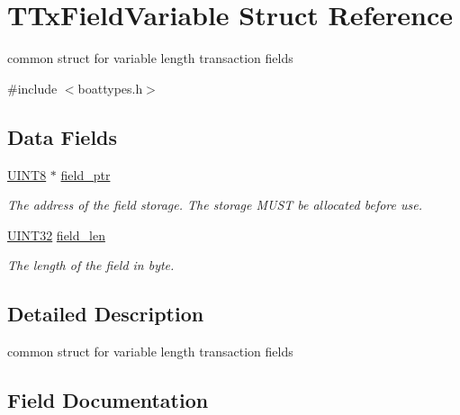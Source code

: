 \hypertarget{struct_t_tx_field_variable}{}\section{T\+Tx\+Field\+Variable Struct Reference}
\label{struct_t_tx_field_variable}


common struct for variable length transaction fields  




{\ttfamily \#include $<$boattypes.\+h$>$}

\subsection*{Data Fields}
\begin{DoxyCompactItemize}
\item 
\mbox{\hyperlink{boattypes_8h_ab27e9918b538ce9d8ca692479b375b6a}{U\+I\+N\+T8}} $\ast$ \mbox{\hyperlink{struct_t_tx_field_variable_aa9767f761e81f0c09d5cd7690d63578b}{field\+\_\+ptr}}
\begin{DoxyCompactList}\small\item\em The address of the field storage. The storage M\+U\+ST be allocated before use. \end{DoxyCompactList}\item 
\mbox{\hyperlink{boattypes_8h_ae1e6edbbc26d6fbc71a90190d0266018}{U\+I\+N\+T32}} \mbox{\hyperlink{struct_t_tx_field_variable_a37f1b9ab89b19244af4f685f3b6e384a}{field\+\_\+len}}
\begin{DoxyCompactList}\small\item\em The length of the field in byte. \end{DoxyCompactList}\end{DoxyCompactItemize}


\subsection{Detailed Description}
common struct for variable length transaction fields 

\subsection{Field Documentation}
\mbox{\label{struct_t_tx_field_variable_a37f1b9ab89b19244af4f685f3b6e384a}} 
